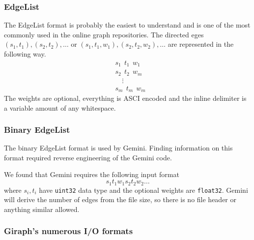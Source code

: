 \subsubsection{EdgeList}
The EdgeList format is probably the easiest to understand and is one of the most commonly used in the online graph repositories. The directed eges $(s_1,t_1),(s_2,t_2),\ldots$ or $(s_1,t_1, w_1),(s_2,t_2, w_2),\ldots$ are represented in the following way.
\begin{align*}
  &s_1\ \ t_1\ \ w_1\\
  &s_2\ \ t_2\ \ w_m\\
	&\quad\vdots\\
  &s_m\ \ t_m\ \ w_m
\end{align*}
The weights are optional, everything is ASCI encoded and the inline delimiter is a variable amount of any whitespace.

\subsubsection{Binary EdgeList}
The binary EdgeList format is used by Gemini. Finding information on this format required reverse engineering of the Gemini code.

We found that Gemini requires the following input format
\begin{equation*}
	s_1t_1w_1s_2t_2w_2\ldots
\end{equation*}
where $s_i,t_i$ have \texttt{uint32} data type and the optional weights are \texttt{float32}.
Gemini will derive the number of edges from the file size, so there is no file header or anything similar allowed.

\subsubsection{Giraph's numerous I/O formats}
